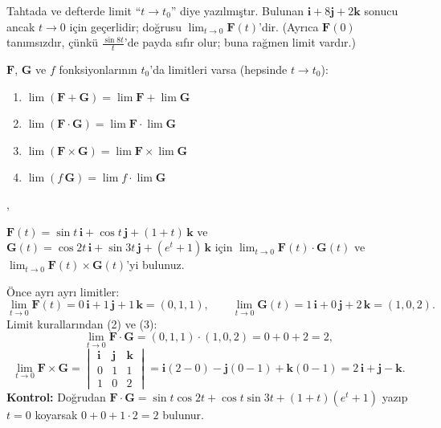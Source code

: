\begin{bilgi}
Tahtada ve defterde limit ``$t\to t_0$'' diye yazılmıştır. Bulunan $\mathbf i+8\mathbf j+2\mathbf k$ sonucu ancak $t\to0$ için
geçerlidir; doğrusu $\lim_{t\to 0}\mathbf F(t)$'dir. (Ayrıca $\mathbf F(0)$ tanımsızdır, çünkü $\frac{\sin 8t}{t}$'de payda sıfır olur;
buna rağmen limit vardır.)
\end{bilgi}

\begin{teorem}
$\mathbf F$, $\mathbf G$ ve $f$ fonksiyonlarının $t_0$'da limitleri varsa (hepsinde $t\to t_0$):
\begin{enumerate}
\item $\lim(\mathbf F+\mathbf G)=\lim\mathbf F+\lim\mathbf G$
\item $\lim(\mathbf F\cdot\mathbf G)=\lim\mathbf F\cdot\lim\mathbf G$
\item $\lim(\mathbf F\times\mathbf G)=\lim\mathbf F\times\lim\mathbf G$
\item $\lim(f\,\mathbf G)=\lim f\cdot\lim\mathbf G$
\end{enumerate}
, 
\end{teorem}

\begin{soru}
$\mathbf F(t)=\sin t\,\mathbf i+\cos t\,\mathbf j+(1+t)\,\mathbf k$ ve $\mathbf G(t)=\cos2t\,\mathbf i+\sin3t\,\mathbf j+(e^t+1)\,\mathbf k$
için $\displaystyle\lim_{t\to0}\mathbf F(t)\cdot\mathbf G(t)$ ve $\displaystyle\lim_{t\to0}\mathbf F(t)\times\mathbf G(t)$'yi bulunuz.
\end{soru}
\begin{cevap}
Önce ayrı ayrı limitler:
\[ \lim_{t\to0}\mathbf F(t)=0\,\mathbf i+1\,\mathbf j+1\,\mathbf k=(0,1,1),\qquad \lim_{t\to0}\mathbf G(t)=1\,\mathbf i+0\,\mathbf j+2\,\mathbf k=(1,0,2). \]
Limit kurallarından (2) ve (3):
\[ \lim_{t\to0}\mathbf F\cdot\mathbf G=(0,1,1)\cdot(1,0,2)=0+0+2=2, \]
\[ \lim_{t\to0}\mathbf F\times\mathbf G=\begin{vmatrix}\mathbf i&\mathbf j&\mathbf k\\0&1&1\\1&0&2\end{vmatrix}
=\mathbf i(2-0)-\mathbf j(0-1)+\mathbf k(0-1)=2\,\mathbf i+\mathbf j-\mathbf k . \]
\textbf{Kontrol:} Doğrudan $\mathbf F\cdot\mathbf G=\sin t\cos2t+\cos t\sin3t+(1+t)(e^t+1)$ yazıp $t=0$ koyarsak $0+0+1\cdot2=2$ bulunur. \checkmark
\end{cevap}

